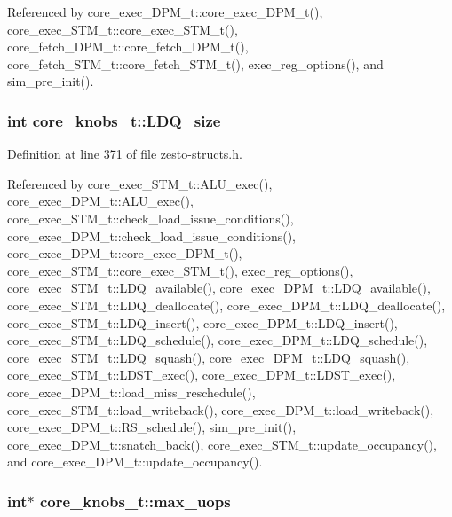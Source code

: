 Referenced by core\_\-exec\_\-DPM\_\-t::core\_\-exec\_\-DPM\_\-t(), core\_\-exec\_\-STM\_\-t::core\_\-exec\_\-STM\_\-t(), core\_\-fetch\_\-DPM\_\-t::core\_\-fetch\_\-DPM\_\-t(), core\_\-fetch\_\-STM\_\-t::core\_\-fetch\_\-STM\_\-t(), exec\_\-reg\_\-options(), and sim\_\-pre\_\-init().
\subsubsection[{LDQ\_\-size}]{\setlength{\rightskip}{0pt plus 5cm}int {\bf core\_\-knobs\_\-t::LDQ\_\-size}}\label{structcore__knobs__t_84e38971897e7c17c06d859c92079204}




Definition at line 371 of file zesto-structs.h.

Referenced by core\_\-exec\_\-STM\_\-t::ALU\_\-exec(), core\_\-exec\_\-DPM\_\-t::ALU\_\-exec(), core\_\-exec\_\-STM\_\-t::check\_\-load\_\-issue\_\-conditions(), core\_\-exec\_\-DPM\_\-t::check\_\-load\_\-issue\_\-conditions(), core\_\-exec\_\-DPM\_\-t::core\_\-exec\_\-DPM\_\-t(), core\_\-exec\_\-STM\_\-t::core\_\-exec\_\-STM\_\-t(), exec\_\-reg\_\-options(), core\_\-exec\_\-STM\_\-t::LDQ\_\-available(), core\_\-exec\_\-DPM\_\-t::LDQ\_\-available(), core\_\-exec\_\-STM\_\-t::LDQ\_\-deallocate(), core\_\-exec\_\-DPM\_\-t::LDQ\_\-deallocate(), core\_\-exec\_\-STM\_\-t::LDQ\_\-insert(), core\_\-exec\_\-DPM\_\-t::LDQ\_\-insert(), core\_\-exec\_\-STM\_\-t::LDQ\_\-schedule(), core\_\-exec\_\-DPM\_\-t::LDQ\_\-schedule(), core\_\-exec\_\-STM\_\-t::LDQ\_\-squash(), core\_\-exec\_\-DPM\_\-t::LDQ\_\-squash(), core\_\-exec\_\-STM\_\-t::LDST\_\-exec(), core\_\-exec\_\-DPM\_\-t::LDST\_\-exec(), core\_\-exec\_\-DPM\_\-t::load\_\-miss\_\-reschedule(), core\_\-exec\_\-STM\_\-t::load\_\-writeback(), core\_\-exec\_\-DPM\_\-t::load\_\-writeback(), core\_\-exec\_\-DPM\_\-t::RS\_\-schedule(), sim\_\-pre\_\-init(), core\_\-exec\_\-DPM\_\-t::snatch\_\-back(), core\_\-exec\_\-STM\_\-t::update\_\-occupancy(), and core\_\-exec\_\-DPM\_\-t::update\_\-occupancy().
\subsubsection[{max\_\-uops}]{\setlength{\rightskip}{0pt plus 5cm}int$\ast$ {\bf core\_\-knobs\_\-t::max\_\-uops}}\label{structcore__knobs__t_8d76625a7e883234d3f1987860d0cbf2}




